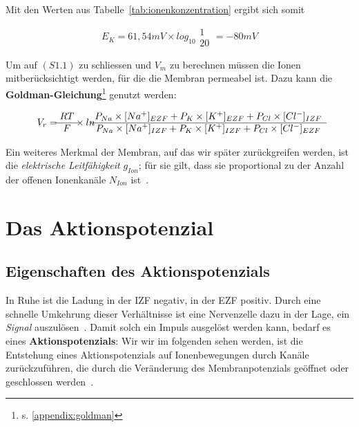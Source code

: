 {{\noindent
Mit den Werten aus Tabelle~\ref{tab:ionenkonzentration}  ergibt sich somit


\begin{equation}
E_{K} = 61,54 mV  \times log_{10} \begin{matrix} 1 \\ \hline 20 \end{matrix} = -80 mV
\label{eq:gl-nernst-reduced-end}
\end{equation}

\noindent
Um auf $(S1.1)$ zu schliessen und $V_m$ zu berechnen müssen die Ionen mitberücksichtigt werden, für die die Membran permeabel ist.
Dazu kann die \textbf{Goldman-Gleichung}\footnote{
 s. \ref{appendix:goldman}
} genutzt werden:

\begin{equation}
V_{r} = \begin{matrix} RT \\ \hline F \end{matrix}  \times ln \begin{matrix}
  P_{Na} \space  \times \space [Na^+]_{EZF} \space + \space P_{K} \space  \times \space [K^+]_{EZF} \space + \space P_{Cl} \space  \times \space [Cl^-]_{IZF}  \\ \hline
  P_{Na} \space  \times [Na^+]_{IZF} \space + \space P_{K} \space  \times \space [K^+]_{IZF} \space + \space P_{Cl} \space  \times \space [Cl^-]_{EZF}
\end{matrix}
\label{eq:gl-goldman}
\end{equation}

Ein weiteres Merkmal der Membran, auf das wir später zurückgreifen werden, ist die \textit{elektrische Leitfähigkeit} $g_{Ion}$; für sie gilt, dass sie proportional zu der Anzahl der offenen Ionenkanäle $N_{Ion}$ ist~\cite[93]{BCP18}.

\section{Das Aktionspotenzial}

\subsection{Eigenschaften des Aktionspotenzials}

In Ruhe ist die Ladung in der IZF negativ, in der EZF positiv.
Durch eine schnelle Umkehrung dieser Verhältnisse ist eine Nervenzelle dazu in der Lage, ein \textit{Signal} auszulösen~\cite[86]{BCP18}.
Damit solch ein Impuls ausgelöst werden kann, bedarf es eines \textbf{Aktionspotenzials}: Wir wir im folgenden sehen werden, ist die Entstehung eines Aktionspotenzials auf Ionenbewegungen durch Kanäle zurückzuführen, die durch die Veränderung des Membranpotenzials geöffnet oder geschlossen werden~\cite[96]{BCP18}.

}}
